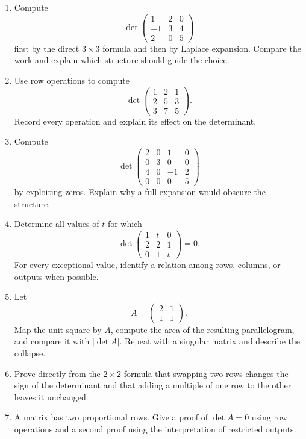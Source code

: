 \begin{enumerate}
\item Compute
\[
\det\begin{pmatrix}1&2&0\\-1&3&4\\2&0&5\end{pmatrix}
\]
first by the direct $3\times3$ formula and then by Laplace expansion. Compare the work and explain which structure should guide the choice.

\item Use row operations to compute
\[
\det\begin{pmatrix}1&2&1\\2&5&3\\3&7&5\end{pmatrix}.
\]
Record every operation and explain its effect on the determinant.

\item Compute
\[
\det\begin{pmatrix}
2&0&1&0\\
0&3&0&0\\
4&0&-1&2\\
0&0&0&5
\end{pmatrix}
\]
by exploiting zeros. Explain why a full expansion would obscure the structure.

\item Determine all values of $t$ for which
\[
\det\begin{pmatrix}
1&t&0\\
2&2&1\\
0&1&t
\end{pmatrix}=0.
\]
For every exceptional value, identify a relation among rows, columns, or outputs when possible.

\item Let
\[
A=\begin{pmatrix}2&1\\1&1\end{pmatrix}.
\]
Map the unit square by $A$, compute the area of the resulting parallelogram, and compare it with $|\det A|$. Repeat with a singular matrix and describe the collapse.

\item Prove directly from the $2\times2$ formula that swapping two rows changes the sign of the determinant and that adding a multiple of one row to the other leaves it unchanged.

\item A matrix has two proportional rows. Give a proof of $\det A=0$ using row operations and a second proof using the interpretation of restricted outputs.


\end{enumerate}
